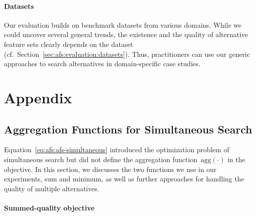 \documentclass{article}
\theoremstyle{definition}
\begin{document}
\paragraph{Datasets}

Our evaluation builds on benchmark datasets from various domains.
While we could uncover several general trends, the existence and the quality of alternative feature sets clearly depends on the dataset (cf.~Section~\ref{sec:afs:evaluation:datasets}).
Thus, practitioners can use our generic approaches to search alternatives in domain-specific case studies.

\appendix

\section{Appendix}
\label{sec:afs:appendix}

\subsection{Aggregation Functions for Simultaneous Search}
\label{sec:afs:appendix:simultaneous-objective-aggregation}

Equation~\ref{eq:afs:afs-simultaneous} introduced the optimization problem of simultaneous search but did not define the aggregation function~$\text{agg}(\cdot)$ in the objective.
In this section, we discusses the two functions we use in our experiments, sum and minimum, as well as further approaches for handling the quality of multiple alternatives.

\paragraph{Summed-quality objective}
\end{document}
